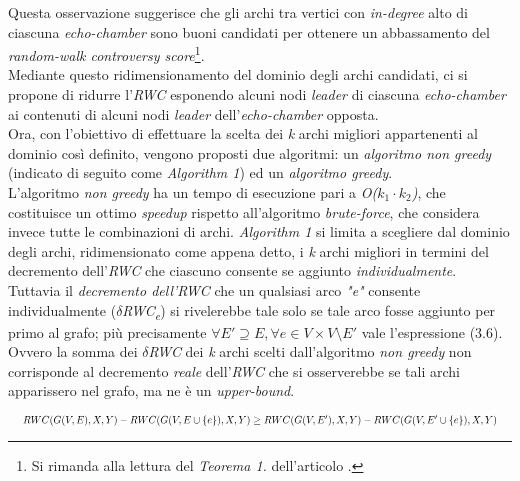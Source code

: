 Questa osservazione suggerisce che gli archi tra vertici con \textit{in-degree} alto di ciascuna \textit{echo-chamber} sono buoni candidati per ottenere un abbassamento del \textit{random-walk controversy score}\footnote{Si rimanda alla lettura del \textit{Teorema 1.} dell'articolo \cite{garimella:paper}.}. 
\\Mediante questo ridimensionamento del dominio degli archi candidati, ci si propone di ridurre l'\textit{RWC} esponendo alcuni nodi \textit{leader} di ciascuna \textit{echo-chamber} ai contenuti di alcuni nodi \textit{leader} dell'\textit{echo-chamber} opposta. 
\\Ora, con l'obiettivo di effettuare la scelta dei \textit{k} archi migliori appartenenti al dominio così definito, vengono proposti due algoritmi: un \textit{algoritmo non greedy} (indicato di seguito come \textit{Algorithm 1}) ed un \textit{algoritmo greedy}.
\\L'algoritmo \textit{non greedy} ha un tempo di esecuzione pari a \textit{O($k_1 \cdot k_2$)}, che costituisce un ottimo \textit{speedup} rispetto all'algoritmo \textit{brute-force}, che considera invece tutte le combinazioni di archi. \textit{Algorithm 1} si limita a scegliere dal dominio degli archi, ridimensionato come appena detto, i \textit{k} archi migliori in termini del decremento dell'\textit{RWC} che ciascuno consente se aggiunto \textit{individualmente}. Tuttavia il \textit{decremento dell'RWC} che un qualsiasi arco \textit{"e"} consente individualmente (\textit{$\delta$RWC\textsubscript{e}}) si rivelerebbe tale solo se tale arco fosse aggiunto per primo al grafo; più precisamente $\forall E' \supseteq E, \forall e \in V \times V \setminus E'$ vale l'espressione (3.6). Ovvero la somma dei \textit{$\delta$RWC} dei \textit{k} archi scelti dall'algoritmo \textit{non greedy} non corrisponde al decremento \textit{reale} dell'\textit{RWC} che si osserverebbe se tali archi apparissero nel grafo, ma ne è un \textit{upper-bound}.

\begin{equation}
\resizebox{1 \textwidth}{!} 
{
    $ RWC(G(V,E),X,Y) - RWC(G(V, E \cup \{e\}),X,Y) \geq RWC(G(V,E'),X,Y) - RWC(G(V, E' \cup \{e\}),X,Y)$
} 
\end{equation}

